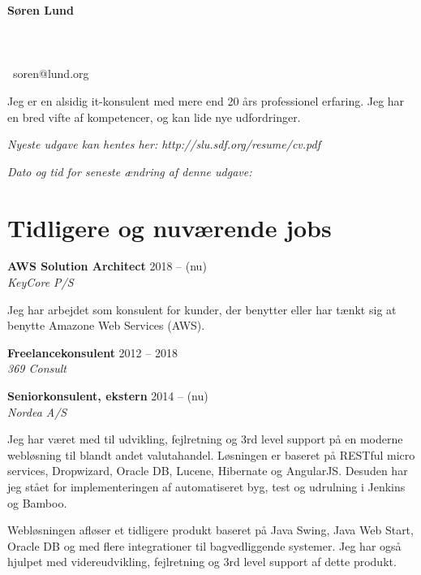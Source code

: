 \documentclass[a4paper,11pt]{article}
\newcommand\redacted{[skjult i online version]}
\newcommand\myaddressone{\redacted}
\newcommand\myaddresstwo{\redacted}
\newcommand\myphone{\redacted}
\begin{document}
\centerline{}
\bigskip

\begin{minipage}[b]{0.30\textwidth}
  \selectfont%
  \textbf{Søren Lund} \\
  \myaddressone \\
  \myaddresstwo \\
  \myphone \\
  \Email\ soren@lund.org
\end{minipage}%
\hfill
\begin{minipage}[b]{0.30\textwidth}
  \selectfont%
  Jeg er en alsidig it-konsulent med
  mere end 20 års professionel
  erfaring. Jeg har en bred vifte af
  kompetencer, og
  kan lide nye udfordringer.
\end{minipage}

\bigskip
\centerline{\small\textit{Nyeste udgave kan hentes her: http://slu.sdf.org/resume/cv.pdf}}
\centerline{\small\textit{Dato og tid for seneste ændring af denne udgave: }}

\section*{Tidligere og nuværende jobs}

\textbf{AWS Solution Architect} \hfill 2018 -- (nu) \\
\textsl{KeyCore P/S}

Jeg har arbejdet som konsulent for kunder, der benytter eller har
tænkt sig at benytte Amazone Web Services (AWS).

\smallskip

\textbf{Freelancekonsulent} \hfill 2012 -- 2018 \\
\textsl{369 Consult}

\smallskip

\textbf{Seniorkonsulent, ekstern} \hfill 2014 -- (nu) \\
\textsl{Nordea A/S}

Jeg har været med til udvikling, fejlretning og 3rd level support på
en moderne webløsning til blandt andet valutahandel. Løsningen er
baseret på RESTful micro services, Dropwizard, Oracle DB, Lucene,
Hibernate og AngularJS. Desuden har jeg stået for implementeringen af
automatiseret byg, test og udrulning i Jenkins og Bamboo.

Webløsningen afløser et tidligere produkt baseret på Java Swing, Java
Web Start, Oracle DB og med flere integrationer til bagvedliggende
systemer. Jeg har også hjulpet med videreudvikling, fejlretning og 3rd
level support af dette produkt.
\end{document}

